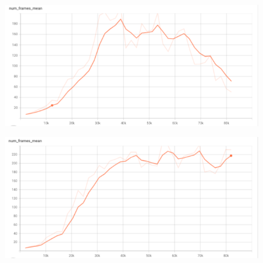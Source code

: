 \begin{figure}[H]
      \begin{minipage}{.5\textwidth}
        \centering
        \includegraphics[width=1\linewidth]{figures/dioframesmean.png}
        \label{fig:framesdio}
      \end{minipage}%
      \begin{minipage}{.5\textwidth}
        \centering
        \includegraphics[width=1\linewidth]{figures/rlframesmean.png}
        \label{fig:framesrl}
      \end{minipage}
      \vspace{0.2cm}


\end{figure}
